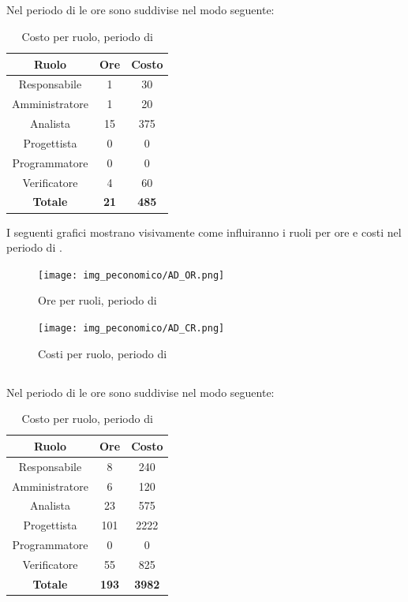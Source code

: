 \subsection{\AD}
Nel periodo di \AD{} le ore sono suddivise nel modo seguente:
\begin{table}[H]
	\centering
	\begin{tabular}{|c|c|c|}
		\hline
		\textbf{Ruolo} &
		\textbf{Ore} &
		\textbf{Costo} \\
		\hline
		Responsabile & 1 & 30\\
		\hline
		Amministratore & 1 & 20\\
		\hline
		Analista & 15 & 375\\
		\hline
		Progettista & 0 & 0 \\
		\hline
		Programmatore & 0 & 0 \\
		\hline
		Verificatore & 4 & 60\\
		\hline
		\textbf{Totale} & \textbf{21} & \textbf{485} \\
		\hline
	\end{tabular}
	\caption{Costo per ruolo, periodo di \AD}
\end{table}

I seguenti grafici mostrano visivamente come influiranno i ruoli per ore e costi nel periodo di \AD.
\begin{figure}[H]
	\centering
	\texttt{[image: img\_peconomico/AD\_OR.png]}
	\caption{Ore per ruoli, periodo di \AD}
\end{figure}
\begin{figure}[H]
	\centering
	\texttt{[image: img\_peconomico/AD\_CR.png]}
	\caption{Costi per ruolo, periodo di \AD}
\end{figure}

\subsection{\PA}
Nel periodo di \PA{} le ore sono suddivise nel modo seguente:
\begin{table}[H]
	\centering
	\begin{tabular}{|c|c|c|}
		\hline
		\textbf{Ruolo} &
		\textbf{Ore} &
		\textbf{Costo} \\
		\hline
		Responsabile & 8 & 240\\
		\hline
		Amministratore & 6 & 120\\
		\hline
		Analista & 23 & 575\\
		\hline
		Progettista & 101 & 2222 \\
		\hline
		Programmatore & 0 & 0 \\
		\hline
		Verificatore & 55 & 825\\
		\hline
		\textbf{Totale} & \textbf{193} & \textbf{3982} \\
		\hline
	\end{tabular}
	\caption{Costo per ruolo, periodo di \PA}
\end{table}

